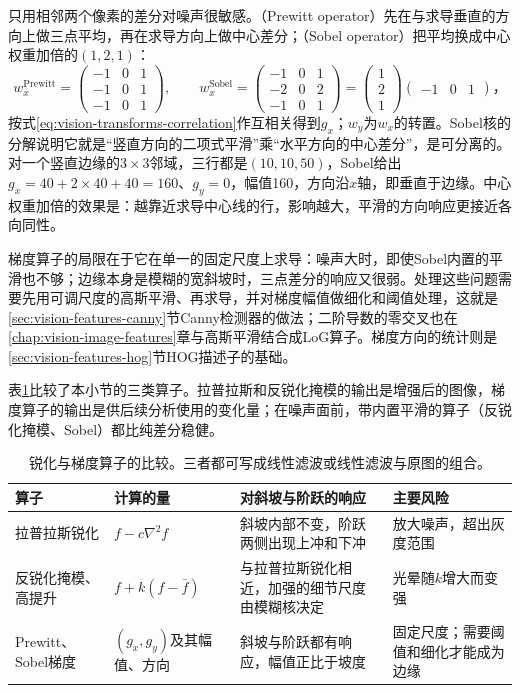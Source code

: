 只用相邻两个像素的差分对噪声很敏感。（Prewitt operator）先在与求导垂直的方向上做三点平均，再在求导方向上做中心差分；（Sobel operator）把平均换成中心权重加倍的$(1,2,1)$：
\begin{equation}
  w_x^{\mathrm{Prewitt}}=\begin{pmatrix}-1&0&1\\-1&0&1\\-1&0&1\end{pmatrix},\qquad
  w_x^{\mathrm{Sobel}}=\begin{pmatrix}-1&0&1\\-2&0&2\\-1&0&1\end{pmatrix}
  =\begin{pmatrix}1\\2\\1\end{pmatrix}\begin{pmatrix}-1&0&1\end{pmatrix}\text{，}
  \label{eq:vision-transforms-sobel}
\end{equation}
按式\eqref{eq:vision-transforms-correlation}作互相关得到$g_x$；$w_y$为$w_x$的转置。Sobel核的分解说明它就是“竖直方向的二项式平滑”乘“水平方向的中心差分”，是可分离的。对一个竖直边缘的$3\times3$邻域，三行都是$(10,10,50)$，Sobel给出$g_x=40+2\times40+40=160$、$g_y=0$，幅值160，方向沿$x$轴，即垂直于边缘。中心权重加倍的效果是：越靠近求导中心线的行，影响越大，平滑的方向响应更接近各向同性。

梯度算子的局限在于它在单一的固定尺度上求导：噪声大时，即使Sobel内置的平滑也不够；边缘本身是模糊的宽斜坡时，三点差分的响应又很弱。处理这些问题需要先用可调尺度的高斯平滑、再求导，并对梯度幅值做细化和阈值处理，这就是\ref{sec:vision-features-canny}节Canny检测器的做法；二阶导数的零交叉也在\ref{chap:vision-image-features}章与高斯平滑结合成LoG算子。梯度方向的统计则是\ref{sec:vision-features-hog}节HOG描述子的基础。

表\ref{tab:vision-transforms-sharpen-compare}比较了本小节的三类算子。拉普拉斯和反锐化掩模的输出是增强后的图像，梯度算子的输出是供后续分析使用的变化量；在噪声面前，带内置平滑的算子（反锐化掩模、Sobel）都比纯差分稳健。

\begin{table}[htbp]
  \centering
  \small
  \begin{tabularx}{\linewidth}{@{}p{20mm}XXX@{}}
    \toprule
    算子 & 计算的量 & 对斜坡与阶跃的响应 & 主要风险\\
    \midrule
    拉普拉斯锐化 & $f-c\nabla^2f$ & 斜坡内部不变，阶跃两侧出现上冲和下冲 & 放大噪声，超出灰度范围\\
    反锐化掩模、高提升 & $f+k(f-\bar f)$ & 与拉普拉斯锐化相近，加强的细节尺度由模糊核决定 & 光晕随$k$增大而变强\\
    Prewitt、Sobel梯度 & $(g_x,g_y)$及其幅值、方向 & 斜坡与阶跃都有响应，幅值正比于坡度 & 固定尺度；需要阈值和细化才能成为边缘\\
    \bottomrule
  \end{tabularx}
  \caption{锐化与梯度算子的比较。三者都可写成线性滤波或线性滤波与原图的组合。}
  \label{tab:vision-transforms-sharpen-compare}
\end{table}

